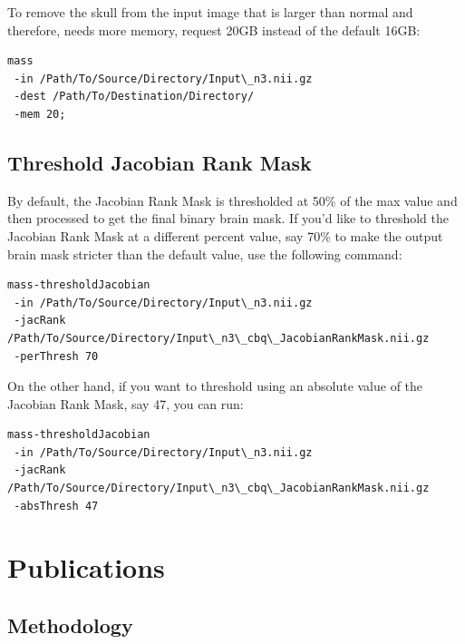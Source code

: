 \documentclass[letterpaper,10pt,english]{sphinxhowto}
\begin{document}
To remove the skull from the input image that is larger than normal and therefore,
needs more memory, request 20GB instead of the default 16GB:

\begin{Verbatim}[commandchars=\\\{\}]
mass
 -in /Path/To/Source/Directory/Input\_n3.nii.gz
 -dest /Path/To/Destination/Directory/
 -mem 20;
\end{Verbatim}


\subsection{Threshold Jacobian Rank Mask}
\label{manual:threshold-jacobian-rank-mask}
By default, the Jacobian Rank Mask is thresholded at 50\% of the max value and then processed
to get the final binary brain mask. If you'd like to threshold the Jacobian Rank Mask at a different percent value,
say 70\% to make the output brain mask stricter than the default value, use the following command:

\begin{Verbatim}[commandchars=\\\{\}]
mass-thresholdJacobian
 -in /Path/To/Source/Directory/Input\_n3.nii.gz
 -jacRank /Path/To/Source/Directory/Input\_n3\_cbq\_JacobianRankMask.nii.gz
 -perThresh 70
\end{Verbatim}

On the other hand, if you want to threshold using an absolute value of the Jacobian Rank Mask, say 47, you can run:

\begin{Verbatim}[commandchars=\\\{\}]
mass-thresholdJacobian
 -in /Path/To/Source/Directory/Input\_n3.nii.gz
 -jacRank /Path/To/Source/Directory/Input\_n3\_cbq\_JacobianRankMask.nii.gz
 -absThresh 47
\end{Verbatim}
\pagebreak

\section{Publications}
\label{publications::doc}\label{publications:publications}

\subsection{Methodology}
\label{publications:methodology}\cite{ARAD2013}

\cite{MedIA2011}
\end{document}
